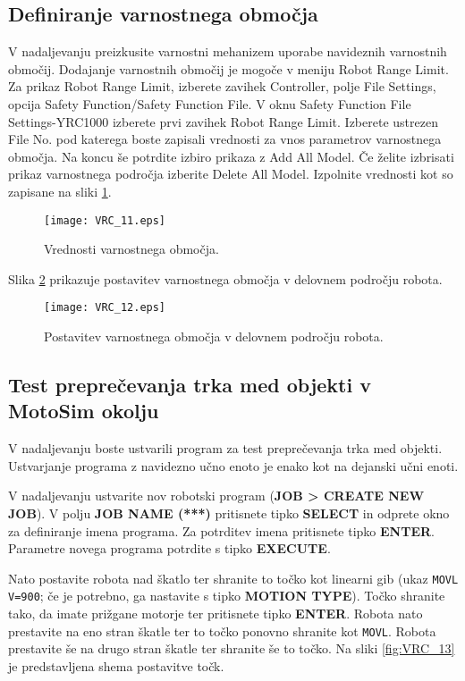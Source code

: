 \subsection*{Definiranje varnostnega območja}

V nadaljevanju preizkusite varnostni mehanizem uporabe navideznih varnostnih območij. Dodajanje varnostnih območij je mogoče v meniju Robot Range Limit. Za prikaz Robot Range Limit, izberete zavihek Controller, polje File Settings, opcija Safety Function/Safety Function File. V oknu Safety Function File Settings-YRC1000 izberete prvi zavihek Robot Range Limit. Izberete ustrezen File No. pod katerega boste zapisali vrednosti za vnos parametrov varnostnega območja. Na koncu še potrdite izbiro prikaza z Add All Model. Če želite izbrisati prikaz varnostnega področja izberite Delete All Model. Izpolnite vrednosti kot so zapisane na sliki \ref{fig:VRC_11}.

\begin{figure}[hbt]
	\centering
	\texttt{[image: VRC\_11.eps]}
	\caption{Vrednosti varnostnega območja.}
	\label{fig:VRC_11}
\end{figure}

Slika \ref{fig:VRC_12} prikazuje postavitev varnostnega območja v delovnem področju robota.

\begin{figure}[hbt]
	\centering
	\texttt{[image: VRC\_12.eps]}
	\caption{Postavitev varnostnega območja v delovnem področju robota.}
	\label{fig:VRC_12}
\end{figure}


\subsection*{Test preprečevanja trka med objekti v MotoSim okolju}

V nadaljevanju boste ustvarili program za test preprečevanja trka med objekti. Ustvarjanje programa z navidezno učno enoto je enako kot na dejanski učni enoti. 

V nadaljevanju ustvarite nov robotski program (\textbf{JOB > CREATE NEW JOB}). V polju \textbf{JOB NAME (***)} pritisnete tipko \textbf{SELECT} in odprete okno za definiranje imena programa. Za potrditev imena pritisnete tipko \textbf{ENTER}. Parametre novega programa potrdite s tipko \textbf{EXECUTE}.

Nato postavite robota nad škatlo ter shranite to točko kot linearni gib (ukaz \verb"MOVL V=900"; če je potrebno, ga nastavite s tipko \textbf{MOTION TYPE}). Točko shranite tako, da imate prižgane motorje ter pritisnete tipko \textbf{ENTER}. Robota nato prestavite na eno stran škatle ter to točko ponovno shranite kot \verb"MOVL". Robota prestavite še na drugo stran škatle ter shranite še to točko. Na sliki \ref{fig:VRC_13} je predstavljena shema postavitve točk.

